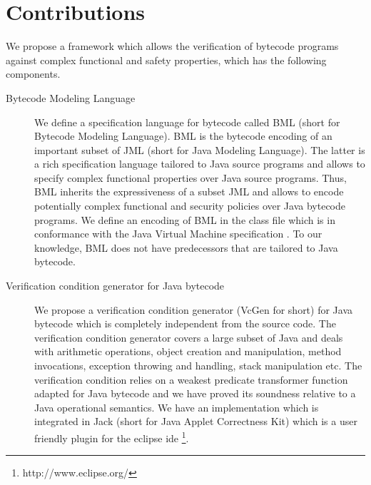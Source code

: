    \section{Contributions}
   We propose a framework which allows the verification of bytecode programs against complex
   functional and safety properties, which has the following    components.
\begin{description}
     \item [Bytecode Modeling Language] 
         


         We define a   specification language for bytecode called BML (short for Bytecode Modeling Language). 
         BML is the bytecode encoding of an important subset of JML (short for Java Modeling Language). The latter is a rich specification
         language tailored to Java source programs and allows to specify complex functional properties over Java source programs.
         Thus, BML inherits the expressiveness of a subset JML and allows to encode potentially 
         complex functional and security policies over Java bytecode programs.
         We define an encoding of BML in the class file which is in conformance with the Java Virtual Machine specification \cite{VMSpec}.
         To our knowledge, BML does not have predecessors that are tailored to Java bytecode.
 
   \item [Verification condition generator for Java bytecode]
          We propose a verification condition generator (VcGen for short) for Java bytecode which is completely independent from 
         the source code. The verification condition generator covers a large subset of Java and deals with
         arithmetic operations, object creation and manipulation,
         method invocations, exception throwing and handling, stack manipulation etc.
         The verification condition relies on a weakest predicate transformer function adapted for Java bytecode and we
         have proved its soundness relative to a Java operational semantics.
         We have an implementation which is integrated in Jack (short for Java Applet Correctness Kit) \cite{BRL-JACK} which is a user friendly 
         plugin for the eclipse ide \footnote{http://www.eclipse.org/}. 
         

\end{description}
